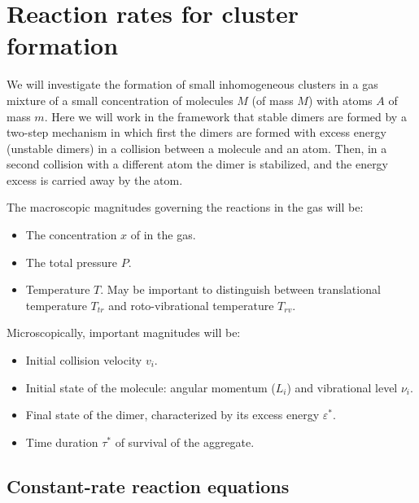\chapter{Reaction rates for cluster formation}
\label{C:react-rates-cluster}
We will investigate the formation of small inhomogeneous clusters in a gas mixture of a small concentration of molecules $M$ (of mass $M$) with atoms $A$ of mass $m$.
Here we will work in the framework that stable dimers are formed by a two-step mechanism in which first the dimers are formed with excess energy (unstable dimers) in a collision between a molecule and an atom. Then, in a second collision with a different atom the dimer is stabilized, and the energy excess is carried away by the atom. 


The macroscopic magnitudes governing the reactions in the gas will be:
\begin{itemize}
\item The concentration $x$ of  in the gas.
\item The total pressure $P$.
\item Temperature $T$. May be important to distinguish between translational temperature $T_{tr}$ and roto-vibrational temperature $T_{rv}$.
\end{itemize}

Microscopically, important magnitudes will be:
\begin{itemize}
\item Initial collision velocity $v_{i}$.
\item Initial state of the molecule: angular momentum ($L_{i}$) and vibrational level $\nu_{i}$.
\item Final state of the dimer, characterized by its excess energy $\varepsilon^{*}$.
\item Time duration $\tau^{*}$ of survival of the aggregate.
\end{itemize}



\section{Constant-rate reaction equations}
\label{S:const-rate-reaction}

